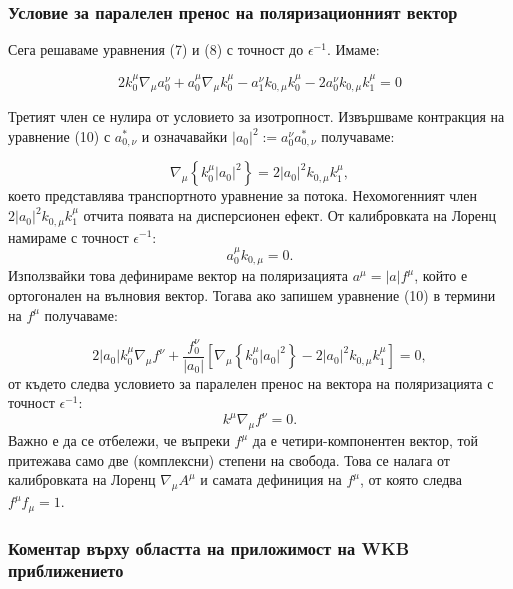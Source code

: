 \subsubsection{Условие за паралелен пренос на поляризационният вектор}

Сега решаваме уравнения (7) и (8) с точност до $\epsilon^{-1}$. Имаме:

\begin{equation}
	2 k_0^\mu\nabla_\mu a_0^\nu + a_0^\mu\nabla_\mu k^\mu_0 - a_1^\nu k_{0,\mu} k^\mu_0 - 2 a_0^\nu k_{0,\mu}k^\mu_1 = 0
\end{equation}

Третият член се нулира от условието за изотропност. Извършваме контракция на уравнение (10) с $a^*_{0,\nu}$ и означавайки $|a_0|^2 := a^\nu_0 a^*_{0,\nu}$ получаваме:

\begin{equation}
	\nabla_\mu\left\{k_0^\mu |a_0|^2\right\} = 2  |a_0|^2 k_{0,\mu}k_1^\mu,
\end{equation}
което представлява транспортното уравнение за потока. Нехомогенният член $2  |a_0|^2 k_{0,\mu}k_1^\mu$ отчита появата на дисперсионен ефект.
От калибровката на Лоренц намираме с точност $\epsilon^{-1}$:
\begin{equation}\label{a_orthog_k}
	a_0^\mu k_{0,\mu} = 0.
\end{equation}
Използвайки това дефинираме вектор на поляризацията $a^\mu = |a|f^\mu$, който е ортогонален на вълновия вектор. Тогава ако запишем уравнение (10) в термини на $f^\mu$ получаваме:

\begin{equation}
	2|a_0|k_0^\mu\nabla_\mu f^\nu + \frac{f^\nu_0}{|a_0|}\left[\nabla_\mu\left\{k_0^\mu |a_0|^2\right\} - 2  |a_0|^2 k_{0,\mu}k_1^\mu\right] = 0,
\end{equation}
от където следва условието за паралелен пренос на вектора на поляризацията с точност $\epsilon^{-1}$:
\begin{equation}
	k^\mu\nabla_\mu f^\nu = 0.
\end{equation}
Важно е да се отбележи, че въпреки $f^\mu$ да е четири-компонентен вектор, той притежава само две (комплексни) степени на свобода. Това се налага от калибровката на Лоренц $\nabla_\mu A^\mu$ и самата дефиниция на $f^\mu$, от която следва $f^\mu f_\mu = 1$.

\subsubsection{Коментар върху областта на приложимост на WKB приближението}

